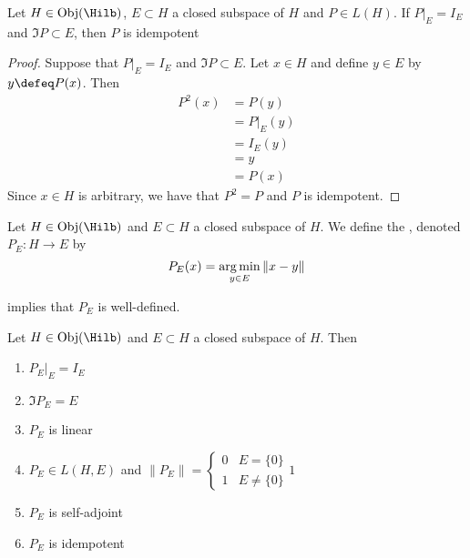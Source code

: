 \documentclass{book}
\begin{document}
\begin{ex}
	Let $H \in \Obj(\Hilb)$, $E \subset H$ a closed subspace of $H$ and $P \in L(H)$. If $P|_E = I_E$ and $\Im P \subset E$, then $P$ is idempotent
\end{ex}

\begin{proof}
	Suppose that $P|_E = I_E$ and $\Im P \subset E$. Let $x \in H$ and define $y \in E$ by $y \defeq P(x)$. Then 
	\begin{align*}
		P^2(x)
		& = P(y) \\
		& = P|_E(y) \\
		& = I_E(y) \\
		& = y \\
		& = P(x) 
	\end{align*} 
	Since $x \in H$ is arbitrary, we have that $P^2 = P$ and $P$ is idempotent.
\end{proof}

\begin{defn}
	Let $H \in \Obj(\Hilb)$ and $E \subset H$ a closed subspace of $H$. We define the , denoted $P_E: H \rightarrow E$ by 
	$$P_E(x) = \operatorname*{arg\,min}\limits_{y \in E} \| x - y\|$$
\end{defn}

\begin{note}
	 implies that $P_E$ is well-defined. 
\end{note}

\begin{ex}
	Let $H \in \Obj(\Hilb)$ and $E \subset H$ a closed subspace of $H$. Then 
	\begin{enumerate}
		\item $P_E|_E = I_E$
		\item $\Im P_E = E$
		\item $P_E$ is linear
		\item $P_E \in L(H, E)$ and $\|P_E\| =  
		\begin{cases}
			0 & E = \{0\} \\
			1 & E \neq \{0\}
		\end{cases}1$
		\item $P_E$ is self-adjoint
		\item $P_E$ is idempotent
	\end{enumerate}
\end{ex}
\end{document}
